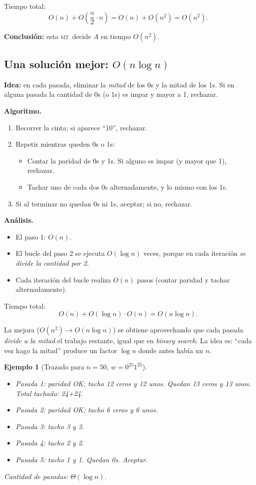 \documentclass[11pt,a4paper]{article}
\theoremstyle{definicion}
\newtheorem{ejemplo}[definicion]{Ejemplo}
\newcommand{\MT}{\textsc{mt}}
\begin{document}
Tiempo total:
\[
O(n) + O\!\left(\frac{n}{2} \cdot n\right) = O(n) + O(n^2) = O(n^2).
\]

\textbf{Conclusión:} esta \MT\ decide $A$ en tiempo $O(n^2)$.

\subsection{Una solución mejor: $O(n \log n)$}

\textbf{Idea:} en cada pasada, eliminar la \emph{mitad} de los 0s y la mitad de los 1s. Si en alguna pasada la cantidad de 0s (o 1s) es impar y mayor a 1, rechazar.

\textbf{Algoritmo.}
\begin{enumerate}
    \item Recorrer la cinta; si aparece ``10'', rechazar.
    \item Repetir mientras queden 0s o 1s:
    \begin{itemize}
        \item Contar la paridad de 0s y 1s. Si alguno es impar (y mayor que 1), rechazar.
        \item Tachar uno de cada dos 0s alternadamente, y lo mismo con los 1s.
    \end{itemize}
    \item Si al terminar no quedan 0s ni 1s, aceptar; si no, rechazar.
\end{enumerate}

\textbf{Análisis.}
\begin{itemize}
    \item El paso 1: $O(n)$.
    \item El bucle del paso 2 se ejecuta $O(\log n)$ veces, porque en cada iteración \emph{se divide la cantidad por 2}.
    \item Cada iteración del bucle realiza $O(n)$ pasos (contar paridad y tachar alternadamente).
\end{itemize}

Tiempo total:
\[
O(n) + O(\log n) \cdot O(n) = O(n \log n).
\]

\begin{intuicion}
La mejora ($O(n^2) \to O(n \log n)$) se obtiene aprovechando que cada pasada \emph{divide a la mitad} el trabajo restante, igual que en \emph{binary search}. La idea es: ``cada vez hago la mitad'' produce un factor $\log n$ donde antes había un $n$.
\end{intuicion}

\begin{ejemplo}[Trazado para $n = 50$, $w = 0^{25} 1^{25}$]
\begin{itemize}
    \item Pasada 1: paridad OK; tacho 12 ceros y 12 unos. Quedan 13 ceros y 13 unos. Total tachado: 24+24.
    \item Pasada 2: paridad OK; tacho 6 ceros y 6 unos.
    \item Pasada 3: tacho 3 y 3.
    \item Pasada 4: tacho 2 y 2.
    \item Pasada 5: tacho 1 y 1. Quedan 0s. Aceptar.
\end{itemize}
Cantidad de pasadas: $\Theta(\log n)$.
\end{ejemplo}
\end{document}
